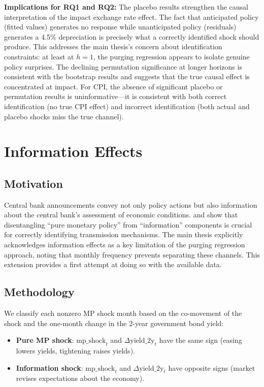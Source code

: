 \documentclass[12pt,a4paper]{article}
\begin{document}
\textbf{Implications for RQ1 and RQ2:} The placebo results strengthen the causal interpretation of the impact exchange rate effect. The fact that anticipated policy (fitted values) generates no response while unanticipated policy (residuals) generates a 4.5\% depreciation is precisely what a correctly identified shock should produce. This addresses the main thesis's concern about identification constraints: at least at $h=1$, the purging regression appears to isolate genuine policy surprises. The declining permutation significance at longer horizons is consistent with the bootstrap results and suggests that the true causal effect is concentrated at impact. For CPI, the absence of significant placebo or permutation results is uninformative---it is consistent with both correct identification (no true CPI effect) and incorrect identification (both actual and placebo shocks miss the true channel).


\section{Information Effects}\label{sec:info}

\subsection{Motivation}

Central bank announcements convey not only policy actions but also information about the central bank's assessment of economic conditions. \citet{nakamura2018} and \citet{jarocinski2020} show that disentangling ``pure monetary policy'' from ``information'' components is crucial for correctly identifying transmission mechanisms. The main thesis explicitly acknowledges information effects as a key limitation of the purging regression approach, noting that monthly frequency prevents separating these channels. This extension provides a first attempt at doing so with the available data.

\subsection{Methodology}

We classify each nonzero MP shock month based on the co-movement of the shock and the one-month change in the 2-year government bond yield:
\begin{itemize}
	\item \textbf{Pure MP shock}: $\text{mp\_shock}_t$ and $\Delta \text{yield\_2y}_t$ have the same sign (easing lowers yields, tightening raises yields).
	\item \textbf{Information shock}: $\text{mp\_shock}_t$ and $\Delta \text{yield\_2y}_t$ have opposite signs (market revises expectations about the economy).
\end{itemize}
\end{document}
